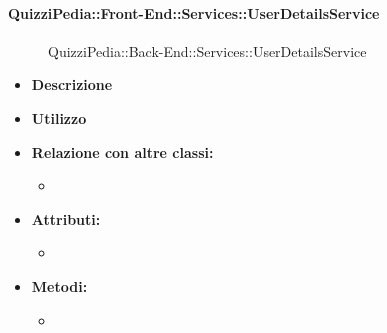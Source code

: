 \paragraph{QuizziPedia::Front-End::Services::UserDetailsService}
\begin{figure}
	\centering
	\caption{QuizziPedia::Back-End::Services::UserDetailsService}
\end{figure}
\begin{itemize}
	\item \textbf{Descrizione} \\ 
	\item \textbf{Utilizzo} \\
	\item \textbf{Relazione con altre classi:}
	\begin{itemize}
		\item 
	\end{itemize}
	\item \textbf{Attributi:}
	\begin{itemize}
		\item 
	\end{itemize}
	\item \textbf{Metodi:}
	\begin{itemize}
		\item 
	\end{itemize}
\end{itemize}
